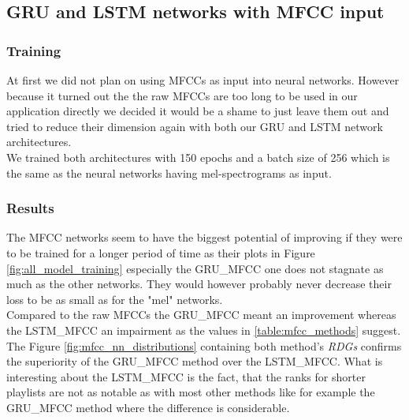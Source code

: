 \subsection{GRU and LSTM networks with MFCC input}

\subsubsection{Training}
At first we did not plan on using MFCCs as input into neural networks. However because it turned out the the raw MFCCs are too long to be used in our application directly we decided it would be a shame to just leave them out and tried to reduce their dimension again with both our GRU and LSTM network architectures. \\ 
We trained both architectures with 150 epochs and a batch size of 256 which is the same as the neural networks having mel-spectrograms as input. 

\subsubsection{Results}

The MFCC networks seem to have the biggest potential of improving if they were to be trained for a longer period of time as their plots in Figure \ref{fig:all_model_training} especially the GRU\_MFCC one does not stagnate as much as the other networks. They would however probably never decrease their loss to be as small as for the "mel" networks. \\
Compared to the raw MFCCs the GRU\_MFCC meant an improvement whereas the LSTM\_MFCC an impairment as the values in \ref{table:mfcc_methods} suggest. The Figure \ref{fig:mfcc_nn_distributions} containing both method's \textit{RDGs} confirms the superiority of the GRU\_MFCC method over the LSTM\_MFCC. What is interesting about the LSTM\_MFCC is the fact, that the ranks for shorter playlists are not as notable as with most other methods like for example the GRU\_MFCC method where the difference is considerable.

